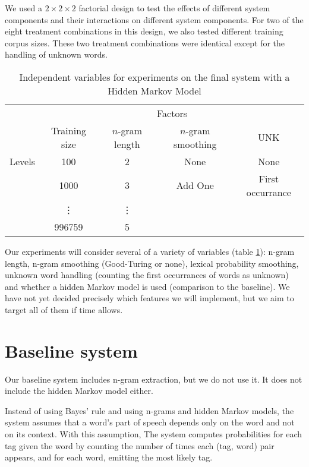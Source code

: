 \documentclass{article}
\begin{document}
We used a $2\times2\times2$ factorial design to test the effects of different
system components and their interactions on different system components.
For two of the eight treatment combinations in this design, we also tested
different training corpus sizes. These two treatment combinations were
identical except for the handling of unknown words.


\begin{table}
\begin{tabular}{lcccc}
& \multicolumn{4}{c}{Factors} \\
\cmidrule{2-5}
       & Training size & $n$-gram length & $n$-gram smoothing & UNK\\
\cmidrule{2-5}
Levels & 100     &  2  & None    & None \\
       & 1000    &  3  & Add One & First occurrance  \\
       & \vdots  &  \vdots  &     &      &      \\
       & 996759  &  5  &     &      &      \\
\cmidrule{2-5}
\end{tabular}
\caption{\label{tab:ind_vars}Independent variables for experiments on the final system with a Hidden Markov Model}
\end{table}

Our experiments will consider several of a variety of variables (table \ref{tab:ind_vars}): n-gram length,
n-gram smoothing (Good-Turing or none), lexical probability smoothing, unknown
word handling (counting the first occurrances of words as unknown) and
whether a hidden Markov model is used (comparison to the baseline).
We have not yet decided precisely which features we will implement, but we
aim to target all of them if time allows.

\section{Baseline system}
Our baseline system includes n-gram extraction,
but we do not use it.
It does not include the hidden Markov model either.

Instead of using Bayes' rule and using n-grams and hidden Markov models,
the system assumes that a word's part of speech depends only
on the word and not on its context. With this assumption,
The system computes probabilities for each tag given the word by counting the
number of times each (tag, word) pair appears, and for each word, emitting the
most likely tag.
\end{document}
